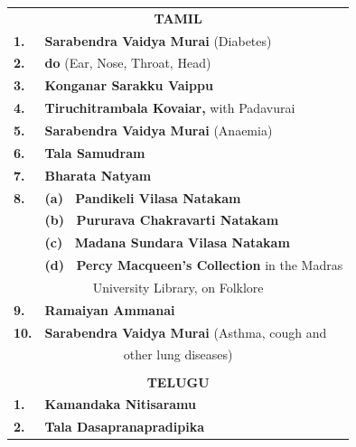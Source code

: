 \documentclass[11pt, openany]{book}
\begin{document}
\begin{table}[h!]
\englishfont\centering
\begin{tabular}{ll}
\multicolumn{2}{c}{\textbf{TAMIL}}                                    \\
\textbf{\small 1.}  & {\small \textbf{ Sarabendra Vaidya Murai} (Diabetes)     }       \\
\textbf{\small 2.}  & \hspace{6mm} {\small \textbf{ do} \hspace{6mm}  (Ear, Nose, Throat, Head) }\\
\textbf{\small 3.}  & {\small \textbf{ Konganar Sarakku Vaippu}} \\
\textbf{\small 4.}  & {\small \textbf{ Tiruchitrambala Kovaiar,} with Padavurai}       \\
\textbf{\small 5.}  & {\small \textbf{ Sarabendra Vaidya Murai}  (Anaemia) }             \\
\textbf{\small 6.}  & {\small \textbf{ Tala Samudram}}                                 \\
\textbf{\small 7.}  & {\small \textbf{ Bharata Natyam}}                                \\
\textbf{\small 8.}  & {\small \textbf{  (a)~ Pandikeli Vilasa Natakam}}                  \\
\textbf{\small }    & {\small \textbf{  (b)~  Pururava Chakravarti Natakam} }             \\
\textbf{\small }    & {\small \textbf{  (c)~  Madana Sundara Vilasa Natakam}}     \\
    \textbf{\small }    & {\small \textbf{  (d)~  Percy Macqueen's Collection} in the Madras}\\
\multicolumn{2}{c}{\small University Library, on Folklore}                   \\
\textbf{\small 9.}  & {\small \textbf{ Ramaiyan Ammanai}}                              \\
\textbf{\small 10.} & {\small \textbf{ Sarabendra Vaidya Murai}} {\small  (Asthma, cough and  }  \\
\multicolumn{2}{c}{\small other lung diseases) }                              \\
&\\
\multicolumn{2}{c}{\textbf{TELUGU}}\\
\textbf{\small 1.}  & {\small \textbf{ Kamandaka Nitisaramu}}                          \\
\textbf{\small 2.}  & {\small \textbf{ Tala Dasapranapradipika}}                       \\

\end{tabular}
\end{table}
\end{document}
